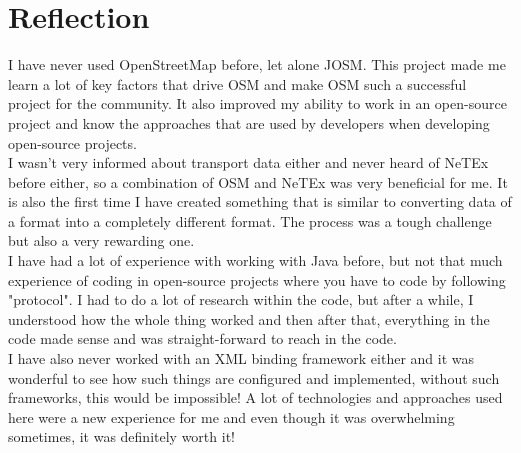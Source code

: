 \section{Reflection}
I have never used OpenStreetMap before, let alone JOSM. This project made me learn a lot of key factors that drive OSM and make OSM such a successful project for the community. It also improved my ability to work in an open-source project and know the approaches that are used by developers when developing open-source projects.\\
\newline
I wasn't very informed about transport data either and never heard of NeTEx before either, so a combination of OSM and NeTEx was very beneficial for me. It is also the first time I have created something that is similar to converting data of a format into a completely different format. The process was a tough challenge but also a very rewarding one.\\
\newline
I have had a lot of experience with working with Java before, but not that much experience of coding in open-source projects where you have to code by following "protocol". I had to do a lot of research within the code, but after a while, I understood how the whole thing worked and then after that, everything in the code made sense and was straight-forward to reach in the code.\\
\newline
I have also never worked with an XML binding framework either and it was wonderful to see how such things are configured and implemented, without such frameworks, this would be impossible! A lot of technologies and approaches used here were a new experience for me and even though it was overwhelming sometimes, it was definitely worth it!